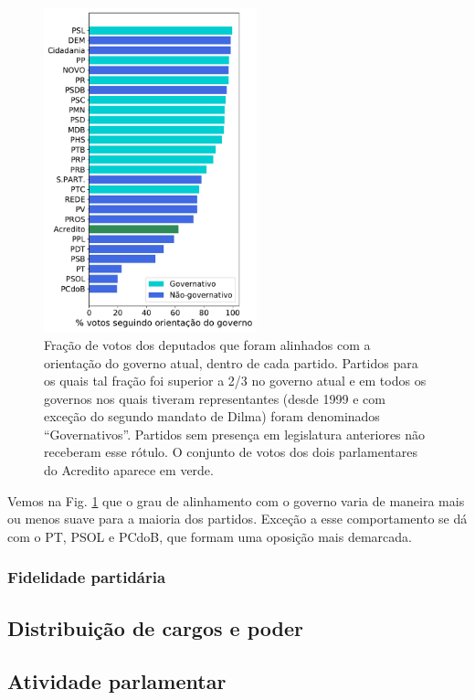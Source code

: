 \documentclass[12pt,a4paper]{article}
\begin{document}
\begin{figure}[t]
\centering
\includegraphics[width=0.55\textwidth]{graficos/apoio_ao_governo_partidos_2019-04-30.pdf}
\caption{Fração de votos dos deputados que foram alinhados com a orientação do governo atual, dentro de cada partido.
  Partidos para os quais tal fração foi superior a 2/3 no governo atual e em todos os governos nos quais tiveram representantes
  (desde 1999 e com exceção do segundo mandato de Dilma) foram denominados ``Governativos''. Partidos
  sem presença em legislatura anteriores não receberam esse rótulo.
  O conjunto de votos dos dois parlamentares do Acredito aparece em verde.}
\label{fig:apoio-governo-partido}
\end{figure} 

Vemos na Fig. \ref{fig:apoio-governo-partido} que o grau de alinhamento com o governo varia de maneira
mais ou menos suave para a maioria dos partidos. Exceção a esse comportamento se dá com o PT, PSOL e
PCdoB, que formam uma oposição mais demarcada.

\subsubsection{Fidelidade partidária}

\subsection{Distribuição de cargos e poder}
\subsection{Atividade parlamentar}
\end{document}
